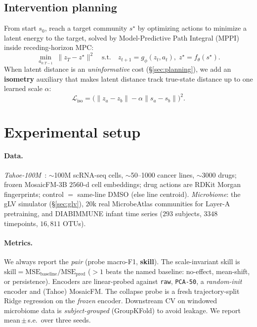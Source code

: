 \documentclass[10pt,twocolumn]{article}
\begin{document}
\subsection{Intervention planning}
\label{sec:plan-method}
From start $s_0$, reach a target community $s^\star$ by optimizing actions to minimize a latent energy
to the target, solved by Model-Predictive Path Integral (MPPI) inside receding-horizon MPC:
\begin{equation}
\min_{a_{0:T-1}}\;\big\lVert z_T-z^\star\big\rVert^2
\quad\text{s.t.}\quad z_{t+1}=g_\phi(z_t,a_t),\; z^\star=f_\theta(s^\star).
\label{eq:mppi}
\end{equation}
When latent distance is an \emph{uninformative} cost (\S\ref{sec:planning}), we add an \textbf{isometry}
auxiliary that makes latent distance track true-state distance up to one learned scale $\alpha$:
\begin{equation}
\mathcal{L}_{\mathrm{iso}}=\big(\lVert z_a-z_b\rVert-\alpha\lVert s_a-s_b\rVert\big)^2 .
\label{eq:iso}
\end{equation}

\section{Experimental setup}
\label{sec:setup}
\paragraph{Data.} \emph{Tahoe-100M}~\cite{tahoe}: $\sim$100M scRNA-seq cells, $\sim$50--1000 cancer lines,
$\sim$3000 drugs; frozen MosaicFM-3B $2560$-d cell embeddings; drug actions are RDKit Morgan
fingerprints; control $=$ same-line DMSO (else line centroid). \emph{Microbiome}: the gLV simulator
(\S\ref{sec:glv}), $20$k real MicrobeAtlas communities for Layer-A pretraining, and DIABIMMUNE infant
time series ($293$ subjects, $3348$ timepoints, $16{,}811$ OTUs).
\paragraph{Metrics.} We always report the \emph{pair} (probe macro-F1, \textbf{skill}). The
scale-invariant skill is $\mathrm{skill}=\mathrm{MSE}_{\mathrm{baseline}}/\mathrm{MSE}_{\mathrm{pred}}$
($>1$ beats the named baseline: no-effect, mean-shift, or persistence). Encoders are linear-probed
against \texttt{raw}, \texttt{PCA-50}, a \emph{random-init} encoder and (Tahoe) MosaicFM. The collapse
probe is a fresh trajectory-split Ridge regression on the \emph{frozen} encoder. Downstream CV on
windowed microbiome data is \emph{subject-grouped} (GroupKFold) to avoid leakage. We report
mean\,$\pm$\,s.e.\ over three seeds.
\end{document}
